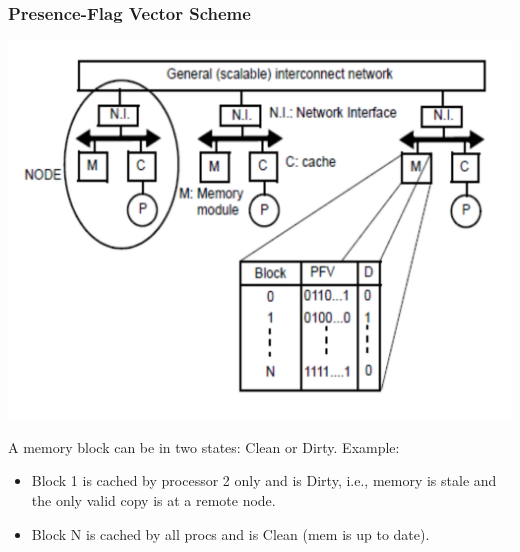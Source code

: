\documentclass{beamer}
\renewcommand{\emph}[1]{\textcolor{structure}{#1}}
\newcommand{\emp}[1]{\textcolor{DikuRed}{ #1}}
\begin{document}
\begin{frame}[fragile,t]
\frametitle{Presence-Flag Vector Scheme}

\includegraphics[width=48ex]{FigsInfCoherence/PresenceFlag}
\vspace{-2ex}

A memory block can be in two states: Clean or Dirty. Example:
\begin{itemize}
    \item Block 1 is cached by processor 2 only and is \emp{Dirty},
            i.e., memory is stale and the only valid copy is at a remote node.
    \item Block N is cached by all procs and is \emph{Clean} (mem is up to date).
\end  {itemize}

\end{frame}
\end{document}
